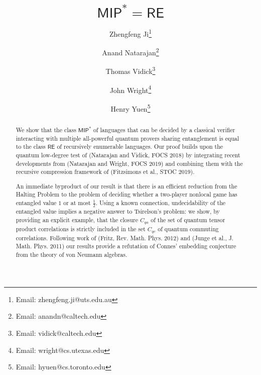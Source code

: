 \documentclass[11pt]{article}
\theoremstyle{definition}
\newcommand{\class}[1]{\ensuremath{\mathsf{#1}}\xspace}
\newcommand{\MIP}{\class{MIP}} %
\newcommand{\RE}{\class{RE}} %
\newcommand{\noteswarning}{{}}
\begin{document}
\title{$\MIP^* = \RE$}
\author[1]{Zhengfeng Ji\footnote{Email: zhengfeng.ji@uts.edu.au}}
\author[2,3]{Anand Natarajan\footnote{Email: anandn@caltech.edu}}
\author[3]{Thomas Vidick\footnote{Email: vidick@caltech.edu}}
\author[2,3,4]{John Wright\footnote{Email: wright@cs.utexas.edu}}
\author[5]{Henry Yuen\footnote{Email: hyuen@cs.toronto.edu}}

\date{}
\maketitle



\begin{abstract}
We show that the class $\MIP^*$ of languages that can be decided by a
classical verifier interacting with multiple all-powerful
quantum provers sharing entanglement is equal to the class $\RE$ of recursively
enumerable languages. Our proof builds upon the quantum low-degree test of (Natarajan and Vidick, FOCS 2018) by integrating recent developments from (Natarajan and Wright, FOCS 2019) and combining them with the recursive compression framework of (Fitzsimons et al., STOC 2019).

An immediate byproduct of our result is that there is an efficient reduction from the Halting Problem to the problem of deciding whether a two-player nonlocal game has entangled value $1$ or at most $\frac{1}{2}$.
Using a known connection, undecidability of the entangled value implies a negative answer to Tsirelson's problem: we show, by providing an explicit example, that the closure $C_{qa}$ of the set of quantum tensor product correlations is strictly included in the set $C_{qc}$ of quantum commuting correlations. Following work of (Fritz, Rev. Math. Phys. 2012) and (Junge et al., J. Math. Phys. 2011) our results provide a refutation of Connes' embedding conjecture from the theory of von Neumann algebras.

\end{abstract}

\newpage

\tableofcontents
\end{document}
